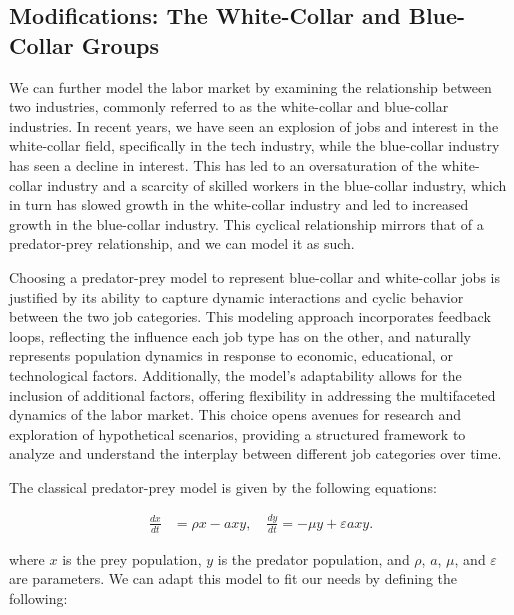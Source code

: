\documentclass[11pt]{amsart}
\begin{document}
\subsection{Modifications: The White-Collar and Blue-Collar Groups}

We can further model the labor market by examining the relationship between two industries, commonly referred to as the white-collar and blue-collar industries.
In recent years, we have seen an explosion of jobs and interest in the white-collar field, specifically in the tech industry, while the blue-collar industry has seen a decline in interest.
This has led to an oversaturation of the white-collar industry and a scarcity of skilled workers in the blue-collar industry, which in turn has slowed growth in the white-collar industry and led to increased growth in the blue-collar industry.
This cyclical relationship mirrors that of a predator-prey relationship, and we can model it as such. 

Choosing a predator-prey model to represent blue-collar and white-collar jobs is justified by its ability to capture dynamic interactions and 
cyclic behavior between the two job categories. This modeling approach incorporates feedback loops, reflecting the influence each job type has 
on the other, and naturally represents population dynamics in response to economic, educational, or technological factors. 
Additionally, the model's adaptability allows for the inclusion of additional factors, offering flexibility in addressing 
the multifaceted dynamics of the labor market. This choice opens avenues for research and exploration of hypothetical scenarios, 
providing a structured framework to analyze and understand the interplay between different job categories over time.

The classical predator-prey model is given by the following equations:


\begin{align}
    \frac{dx}{dt} &= \rho x - a x y, \quad \frac{dy}{dt} = -\mu y + \varepsilon a x y.
\end{align}

where $x$ is the prey population, $y$ is the predator population, and $\rho$, $a$, $\mu$, and $\varepsilon$ are parameters. 
We can adapt this model to fit our needs by defining the following:
\end{document}
